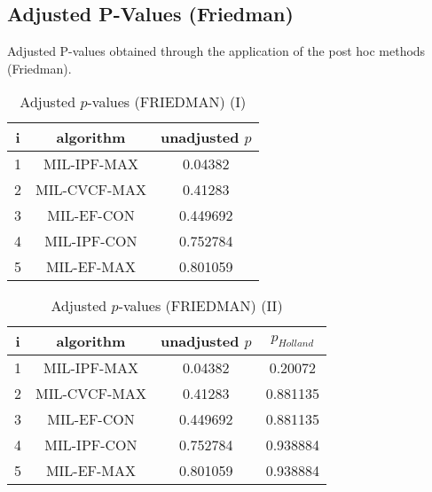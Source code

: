 \documentclass[a4paper,10pt]{article}
\begin{document}
\begin{landscape}
\newpage

\section{Adjusted P-Values (Friedman)}


Adjusted P-values obtained through the application of the post hoc methods (Friedman).

\begin{table}[!htp]
\centering\small
\begin{tabular}{ccc}
i&algorithm&unadjusted $p$\\
\hline1&MIL-IPF-MAX&0.04382\\2&MIL-CVCF-MAX&0.41283\\3&MIL-EF-CON&0.449692\\4&MIL-IPF-CON&0.752784\\5&MIL-EF-MAX&0.801059\\\hline
\end{tabular}
\caption{Adjusted $p$-values (FRIEDMAN) (I)}
\end{table}
\begin{table}[!htp]
\centering\small
\begin{tabular}{cccc}
i&algorithm&unadjusted $p$&$p_{Holland}$\\
\hline1&MIL-IPF-MAX&0.04382&0.20072\\2&MIL-CVCF-MAX&0.41283&0.881135\\3&MIL-EF-CON&0.449692&0.881135\\4&MIL-IPF-CON&0.752784&0.938884\\5&MIL-EF-MAX&0.801059&0.938884\\\hline
\end{tabular}
\caption{Adjusted $p$-values (FRIEDMAN) (II)}
\end{table}

\newpage
\end{landscape}
\end{document}
